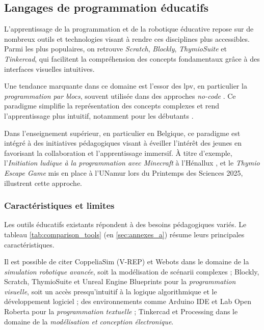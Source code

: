 \subsection{Langages de programmation éducatifs} \label{sec:lgg_progra_educatifs}

L’apprentissage de la programmation et de la robotique éducative repose sur de nombreux outils et technologies visant à rendre ces disciplines plus accessibles.  
Parmi les plus populaires, on retrouve \textit{Scratch}, \textit{Blockly}, \textit{ThymioSuite} et \textit{Tinkercad}, qui facilitent la compréhension des concepts fondamentaux grâce à des interfaces visuelles intuitives.  

Une tendance marquante dans ce domaine est l’essor des \acrfull{lpv}, en particulier la \textit{programmation par blocs}, souvent utilisée dans des approches \textit{no-code} \autocites{noauthor_software_nodate}.  
Ce paradigme simplifie la représentation des concepts complexes et rend l’apprentissage plus intuitif, notamment pour les débutants \autocites{noauthor_visual_2025}{batni_current_2025}.  

Dans l'enseignement supérieur, en particulier en Belgique, ce paradigme est intégré à des initiatives pédagogiques visant à éveiller l’intérêt des jeunes en favorisant la collaboration et l'apprentissage immersif.  
À titre d’exemple, l’\textit{Initiation ludique à la programmation avec Minecraft} à l’Hénallux \autocite{christophe_leclere_initiation_2020}, et le \textit{Thymio Escape Game} \autocite{christian_giang_thymio_nodate} mis en place à l’UNamur lors du Printemps des Sciences 2025, illustrent cette approche.

\subsubsection{Caractéristiques et limites}
Les outils éducatifs existants répondent à des besoins pédagogiques variés.  
Le tableau \ref{tab:comparison_tools} (en \autoref{sec:annexes_a}) résume leurs principales caractéristiques.

Il est possible de citer CoppeliaSim (V-REP) et Webots dans le domaine de la \textit{simulation robotique avancée}, soit la modélisation de scénarii complexes ; Blockly, Scratch, ThymioSuite et Unreal Engine Blueprints pour la \textit{programmation visuelle}, soit un accès presqu'intuitif à la logique algorithmique et le développement logiciel ; des environnements comme Arduino IDE et Lab Open Roberta pour la \textit{programmation textuelle} ; Tinkercad et Processing dans le domaine de la \textit{modélisation et conception électronique}.

